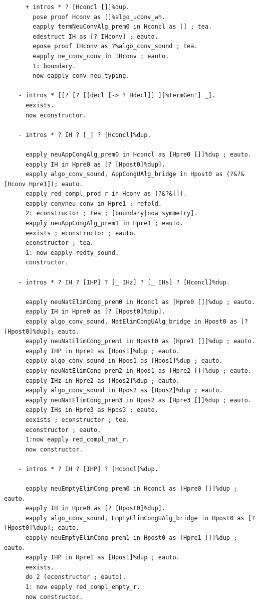 \begin{lstlisting}
      + intros * ? [Hconcl []]%dup.
        pose proof Hconv as []%algo_uconv_wh.
        eapply termNeuConvAlg_prem0 in Hconcl as [] ; tea.
        edestruct IH as [? IHconv] ; eauto.
        epose proof IHconv as ?%algo_conv_sound ; tea.
        eapply ne_conv_conv in IHconv ; eauto.
        1: boundary.
        now eapply conv_neu_typing.

    - intros * [[? [? [[decl [-> ? Hdecl]] ]]%termGen'] _].
      eexists.
      now econstructor.

    - intros * ? IH ? [_] ? [Hconcl]%dup.

      eapply neuAppCongAlg_prem0 in Hconcl as [Hpre0 []]%dup ; eauto.
      eapply IH in Hpre0 as [? [Hpost0]%dup].
      eapply algo_conv_sound, AppCongUAlg_bridge in Hpost0 as (?&?&[Hconv Hpre1]); eauto.
      eapply red_compl_prod_r in Hconv as (?&?&[]).
      eapply convneu_conv in Hpre1 ; refold.
      2: econstructor ; tea ; [boundary|now symmetry].
      eapply neuAppCongAlg_prem1 in Hpre1 ; eauto.
      eexists ; econstructor ; eauto.
      econstructor ; tea.
      1: now eapply redty_sound.
      constructor.

    - intros * ? IH ? [IHP] ? [_ IHz] ? [_ IHs] ? [Hconcl]%dup.

      eapply neuNatElimCong_prem0 in Hconcl as [Hpre0 []]%dup ; eauto.
      eapply IH in Hpre0 as [? [Hpost0]%dup].
      eapply algo_conv_sound, NatElimCongUAlg_bridge in Hpost0 as [? [Hpost0]%dup]; eauto.
      eapply neuNatElimCong_prem1 in Hpost0 as [Hpre1 []]%dup ; eauto.
      eapply IHP in Hpre1 as [Hpos1]%dup ; eauto.
      eapply algo_conv_sound in Hpos1 as [Hpos1]%dup ; eauto.
      eapply neuNatElimCong_prem2 in Hpos1 as [Hpre2 []]%dup ; eauto.
      eapply IHz in Hpre2 as [Hpos2]%dup ; eauto.
      eapply algo_conv_sound in Hpos2 as [Hpos2]%dup ; eauto.
      eapply neuNatElimCong_prem3 in Hpos2 as [Hpre3 []]%dup ; eauto.
      eapply IHs in Hpre3 as Hpos3 ; eauto.
      eexists ; econstructor ; tea.
      econstructor ; eauto.
      1:now eapply red_compl_nat_r.
      now constructor.

    - intros * ? IH ? [IHP] ? [Hconcl]%dup.

      eapply neuEmptyElimCong_prem0 in Hconcl as [Hpre0 []]%dup ; eauto.
      eapply IH in Hpre0 as [? [Hpost0]%dup].
      eapply algo_conv_sound, EmptyElimCongUAlg_bridge in Hpost0 as [? [Hpost0]%dup]; eauto.
      eapply neuEmptyElimCong_prem1 in Hpost0 as [Hpre1 []]%dup ; eauto.
      eapply IHP in Hpre1 as [Hpos1]%dup ; eauto.
      eexists.
      do 2 (econstructor ; eauto).
      1: now eapply red_compl_empty_r.
      now constructor.


\end{lstlisting}
